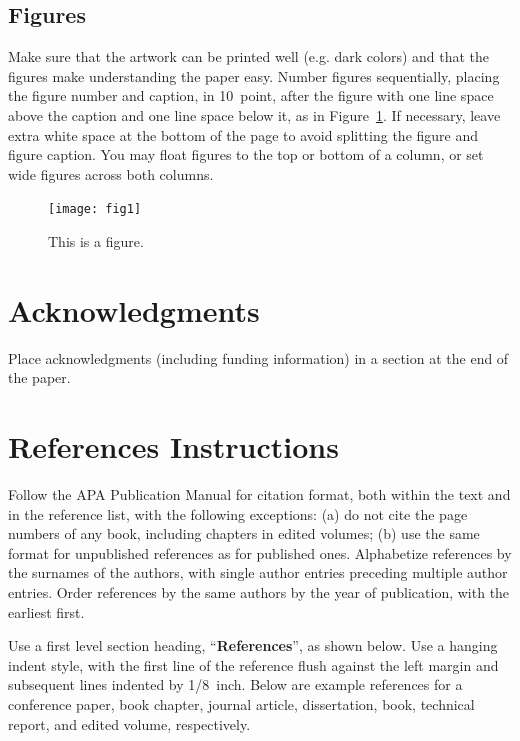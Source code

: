 \documentclass[10pt,letterpaper]{article}
\begin{document}
\subsection{Figures}

Make sure that the artwork can be printed well (e.g. dark colors) and that 
the figures make understanding the paper easy.
 Number figures sequentially, placing the figure
number and caption, in 10~point, after the figure with one line space
above the caption and one line space below it, as in
Figure~\ref{sample-figure}. If necessary, leave extra white space at
the bottom of the page to avoid splitting the figure and figure
caption. You may float figures to the top or bottom of a column, or
set wide figures across both columns.

\begin{figure}[ht]
\begin{center}
\texttt{[image: fig1]}
\end{center}
\caption{This is a figure.} 
\label{sample-figure}
\end{figure}


\section{Acknowledgments}

Place acknowledgments (including funding information) in a section at
the end of the paper.


\section{References Instructions}

Follow the APA Publication Manual for citation format, both within the
text and in the reference list, with the following exceptions: (a) do
not cite the page numbers of any book, including chapters in edited
volumes; (b) use the same format for unpublished references as for
published ones. Alphabetize references by the surnames of the authors,
with single author entries preceding multiple author entries. Order
references by the same authors by the year of publication, with the
earliest first.

Use a first level section heading, ``{\bf References}'', as shown
below. Use a hanging indent style, with the first line of the
reference flush against the left margin and subsequent lines indented
by 1/8~inch. Below are example references for a conference paper, book
chapter, journal article, dissertation, book, technical report, and
edited volume, respectively.



\setlength{\bibleftmargin}{.125in}
\setlength{\bibindent}{-\bibleftmargin}


\end{document}
